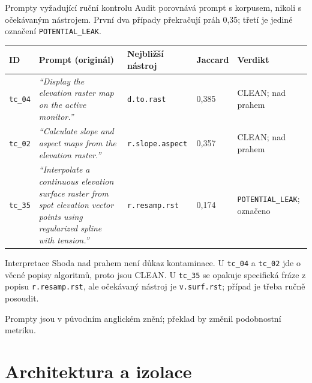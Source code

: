 \documentclass[aspectratio=169,10pt]{beamer}
\begin{document}
\begin{frame}[t]{Prompty vyžadující ruční kontrolu}
  \footnotesize
  \noindent Audit porovnává prompt s korpusem, nikoli s očekávaným nástrojem.
  První dva případy překračují práh 0{,}35; třetí je jediné označení
  \texttt{POTENTIAL\_LEAK}.

  \vspace{1mm}
  {\renewcommand{\arraystretch}{0.92}
  \begin{table}
    \centering
    \begin{tabular}{@{}p{1.0cm}p{5.7cm}p{2.4cm}p{1.0cm}p{2.1cm}@{}}
      \toprule
      \textbf{ID} & \textbf{Prompt (originál)} & \textbf{Nejbližší nástroj}
        & \textbf{Jaccard} & \textbf{Verdikt} \\
      \midrule
      \texttt{tc\_04}
        & \textit{``Display the elevation raster map on the active monitor.''}
        & \texttt{d.to.rast} & 0{,}385 & CLEAN; nad prahem \\
      \texttt{tc\_02}
        & \textit{``Calculate slope and aspect maps from the elevation raster.''}
        & \texttt{r.slope.aspect} & 0{,}357 & CLEAN; nad prahem \\
      \texttt{tc\_35}
        & \textit{``Interpolate a continuous elevation surface raster from spot elevation vector points using regularized spline with tension.''}
        & \texttt{r.resamp.rst} & 0{,}174
        & \texttt{POTENTIAL\_LEAK}; označeno \\
      \bottomrule
    \end{tabular}
  \end{table}}

  \begin{block}{Interpretace}
    Shoda nad prahem není důkaz kontaminace. U \texttt{tc\_04} a \texttt{tc\_02}
    jde o věcné popisy algoritmů, proto jsou CLEAN. U \texttt{tc\_35} se opakuje
    specifická fráze z popisu \texttt{r.resamp.rst}, ale očekávaný nástroj je
    \texttt{v.surf.rst}; případ je třeba ručně posoudit.
  \end{block}

  {\scriptsize Prompty jsou v původním anglickém znění; překlad by změnil
  podobnostní metriku.}
\end{frame}

\section{Architektura a izolace}
\end{document}
